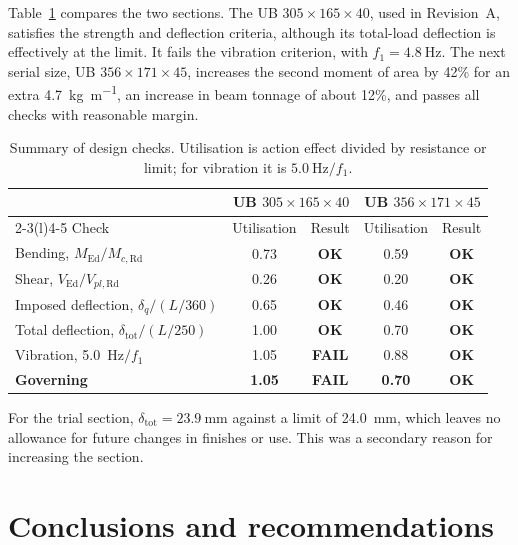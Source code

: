 \documentclass[11pt,a4paper]{article}
\newcommand{\pass}{\textcolor{green!50!black}{\textbf{OK}}}
\newcommand{\fail}{\textcolor{red!70!black}{\textbf{FAIL}}}
\begin{document}
Table~\ref{tab:summary} compares the two sections. The UB $305\times165\times40$, used in Revision~A, satisfies the strength and deflection criteria, although its total-load deflection is effectively at the limit. It fails the vibration criterion, with $f_1 = \qty{4.8}{\hertz}$. The next serial size, UB $356\times171\times45$, increases the second moment of area by 42\% for an extra \qty{4.7}{\kilo\gram\per\metre}, an increase in beam tonnage of about 12\%, and passes all checks with reasonable margin.

\begin{table}[H]
  \centering
  \caption{Summary of design checks. Utilisation is action effect divided by resistance or limit; for vibration it is $\qty{5.0}{\hertz}/f_1$.}
  \label{tab:summary}
  \begin{tabularx}{\textwidth}{@{}X cc cc@{}}
    \toprule
    & \multicolumn{2}{c}{UB $305\times165\times40$} & \multicolumn{2}{c}{UB $356\times171\times45$} \\
    \cmidrule(lr){2-3}\cmidrule(l){4-5}
    Check & Utilisation & Result & Utilisation & Result \\
    \midrule
    Bending, $M_{\text{Ed}}/M_{c,\text{Rd}}$ & 0.73 & \pass & 0.59 & \pass \\
    Shear, $V_{\text{Ed}}/V_{pl,\text{Rd}}$ & 0.26 & \pass & 0.20 & \pass \\
    Imposed deflection, $\delta_q/(L/360)$ & 0.65 & \pass & 0.46 & \pass \\
    Total deflection, $\delta_{\text{tot}}/(L/250)$ & 1.00 & \pass & 0.70 & \pass \\
    Vibration, \qty{5.0}{\hertz}$/f_1$ & 1.05 & \fail & 0.88 & \pass \\
    \midrule
    \textbf{Governing} & \textbf{1.05} & \fail & \textbf{0.70} & \pass \\
    \bottomrule
  \end{tabularx}
\end{table}

For the trial section, $\delta_{\text{tot}} = \qty{23.9}{\milli\metre}$ against a limit of \qty{24.0}{\milli\metre}, which leaves no allowance for future changes in finishes or use. This was a secondary reason for increasing the section.

\section{Conclusions and recommendations}
\label{sec:conclusions}
\end{document}
